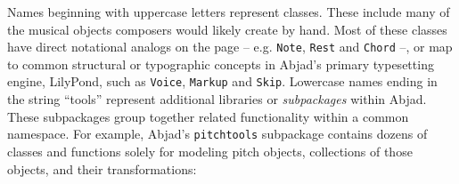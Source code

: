 \noindent Names beginning with uppercase letters represent classes. These
include many of the musical objects composers would likely create by hand. Most
of these classes have direct notational analogs on the page -- e.g.
\texttt{Note}, \texttt{Rest} and \texttt{Chord} --, or map to common structural
or typographic concepts in Abjad's primary typesetting engine, LilyPond, such
as \texttt{Voice}, \texttt{Markup} and \texttt{Skip}. Lowercase names ending in
the string \enquote{tools} represent additional libraries or \emph{subpackages}
within Abjad. These subpackages group together related functionality within a
common namespace. For example, Abjad's \texttt{pitchtools} subpackage contains
dozens of classes and functions solely for modeling pitch objects, collections
of those objects, and their transformations:

\begin{comment}
<abjad>[text_width=105]
pitchtools_names = dir(abjad.pitchtools)
pitchtools_names = [x for x in pitchtools_names if not x.startswith('_')]
print(pitchtools_names)
</abjad>
\end{comment}

